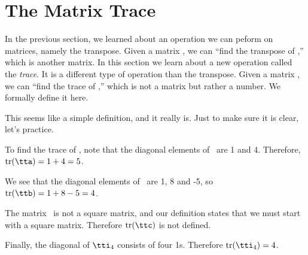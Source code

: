 \section{The Matrix Trace}\label{sec:trace}


In the previous section, we learned about an operation we can peform on matrices, namely the transpose. Given a matrix \tta, we can ``find the transpose of \tta,'' which is another matrix. In this section we learn about a new operation called the \textit{trace}. It is a different type of operation than the transpose. Given a matrix \tta, we can ``find the trace of \tta,'' which is not a matrix but rather a number. We formally define it here.

\smallskip


\smallskip

This seems like a simple definition, and it really is. Just to make sure it is clear, let's practice.\\

\medskip

{To find the trace of \tta, note that the diagonal elements of \tta\ are 1 and 4. Therefore, $\tr(\tta) = 1+4 = 5$.

We see that the diagonal elements of \ttb\ are 1, 8 and -5, so $\tr(\ttb) = 1+8-5 = 4$.

The matrix \ttc\ is not a square matrix, and our definition states that we must start with a square matrix. Therefore $\tr(\ttc)$ is not defined.

Finally, the diagonal of $\tti_4$ consists of four 1s. Therefore $\tr(\tti_4) = 4$.}

